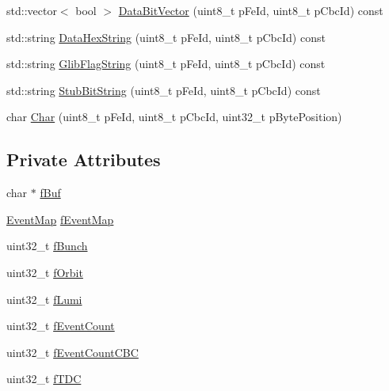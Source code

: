 \begin{DoxyCompactItemize}
\item 
std\-::vector$<$ bool $>$ \hyperlink{class_ph2___hw_interface_1_1_event_a54db44c9de8f4ca816d8cadcaa733260}{Data\-Bit\-Vector} (uint8\-\_\-t p\-Fe\-Id, uint8\-\_\-t p\-Cbc\-Id) const 
\item 
std\-::string \hyperlink{class_ph2___hw_interface_1_1_event_ab7a41db929dba07f724a0b0f3e5ba626}{Data\-Hex\-String} (uint8\-\_\-t p\-Fe\-Id, uint8\-\_\-t p\-Cbc\-Id) const 
\item 
std\-::string \hyperlink{class_ph2___hw_interface_1_1_event_a8b6a50a409927366a830084f11885882}{Glib\-Flag\-String} (uint8\-\_\-t p\-Fe\-Id, uint8\-\_\-t p\-Cbc\-Id) const 
\item 
std\-::string \hyperlink{class_ph2___hw_interface_1_1_event_abc647a9563bd796f8785590a2b5b525b}{Stub\-Bit\-String} (uint8\-\_\-t p\-Fe\-Id, uint8\-\_\-t p\-Cbc\-Id) const 
\item 
char \hyperlink{class_ph2___hw_interface_1_1_event_a348abea85bdfdfc8c0b88cda907dbea8}{Char} (uint8\-\_\-t p\-Fe\-Id, uint8\-\_\-t p\-Cbc\-Id, uint32\-\_\-t p\-Byte\-Position)
\end{DoxyCompactItemize}
\subsection*{Private Attributes}
\begin{DoxyCompactItemize}
\item 
char $\ast$ \hyperlink{class_ph2___hw_interface_1_1_event_ab396cf1480f11b535d0e464aa6f9f046}{f\-Buf}
\item 
\hyperlink{namespace_ph2___hw_interface_acf9f41d647e7a3ad9bae233b04b9e3bc}{Event\-Map} \hyperlink{class_ph2___hw_interface_1_1_event_ace9844f1fc14895f880ed111c705d392}{f\-Event\-Map}
\item 
uint32\-\_\-t \hyperlink{class_ph2___hw_interface_1_1_event_ae5b69f2e0a9c9c947f7a37b7dcf380dc}{f\-Bunch}
\item 
uint32\-\_\-t \hyperlink{class_ph2___hw_interface_1_1_event_a6aa6c402d2b16e735fbb4b7518c2666e}{f\-Orbit}
\item 
uint32\-\_\-t \hyperlink{class_ph2___hw_interface_1_1_event_a78afd0886560acf70ee6b982c5690e0a}{f\-Lumi}
\item 
uint32\-\_\-t \hyperlink{class_ph2___hw_interface_1_1_event_add8f3a445ae11e54b47af7690074a4ce}{f\-Event\-Count}
\item 
uint32\-\_\-t \hyperlink{class_ph2___hw_interface_1_1_event_ac61b0e2c53e5d4228d43132f470dfdac}{f\-Event\-Count\-C\-B\-C}
\item 
uint32\-\_\-t \hyperlink{class_ph2___hw_interface_1_1_event_ab91638311238d12f1cd258556c8d1d80}{f\-T\-D\-C}
\end{DoxyCompactItemize}


